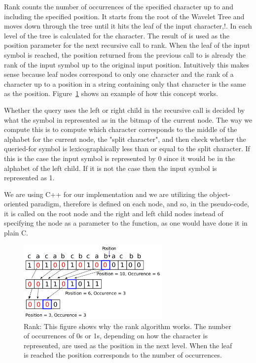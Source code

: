 Rank counts the number of occurrences of the specified character up to and including the specified position. 
It starts from the root of the Wavelet Tree and moves down through the tree until it hits the leaf of the input character,!\citep[Section 2.2]{Claude08practicalrankselect}. 
In each level of the tree  is calculated for the character. 
The result of  is used as the position parameter for the next recursive call to rank.
When the leaf of the input symbol is reached, the position returned from the previous call to  is already the rank of the input symbol up to the original input position.
Intuitively this makes sense because leaf nodes correspond to only one character and the rank of a character up to a position in a string containing only that character is the same as the position.
Figure~\ref{fig:RankDrawing} shows an example of how this concept works.

Whether the query uses the left or right child in the recursive call is decided by what the symbol in represented as in the bitmap of the current node.
The way we compute this is to compute which character corresponds to the middle of the alphabet for the current node, the "split character", and then check whether the queried-for symbol is lexicographically less than or equal to the split character. 
If this is the case the input symbol is represented by 0 since it would be in the alphabet of the left child.
If it is not the case then the input symbol is represented as 1.

We are using C++ for our implementation and we are utilizing the object-oriented paradigm, therefore  is defined on each node, and so, in the pseudo-code, it is called on the root node and the right and left child nodes instead of specifying the node as a parameter to the  function, as one would have done it in plain C.

\begin{figure}
\center \includegraphics[width=0.66\textwidth]{RankDrawing}
\caption{Rank: This figure shows why the rank algorithm works. The number of occurrences of 0s or 1s, depending on how the character is represented, are used as the position in the next level. 
When the leaf is reached the position corresponds to the number of occurrences.}
\label{fig:RankDrawing}
\end{figure}

